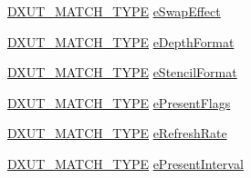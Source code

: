 \begin{DoxyCompactItemize}
\item 
\hyperlink{_d_x_u_t_8h_aaa7d287a94f58c93d67a7ec6b4cb0ee3}{DXUT\_\-MATCH\_\-TYPE} \hyperlink{struct_d_x_u_t_match_options_a6edc86eb4a2a396296cb02744d2b5bc1}{eSwapEffect}
\item 
\hyperlink{_d_x_u_t_8h_aaa7d287a94f58c93d67a7ec6b4cb0ee3}{DXUT\_\-MATCH\_\-TYPE} \hyperlink{struct_d_x_u_t_match_options_abcc0bcc900600d47b8bfb3ff14729642}{eDepthFormat}
\item 
\hyperlink{_d_x_u_t_8h_aaa7d287a94f58c93d67a7ec6b4cb0ee3}{DXUT\_\-MATCH\_\-TYPE} \hyperlink{struct_d_x_u_t_match_options_a42c0d060fd4f125aa830a4bc129a11d7}{eStencilFormat}
\item 
\hyperlink{_d_x_u_t_8h_aaa7d287a94f58c93d67a7ec6b4cb0ee3}{DXUT\_\-MATCH\_\-TYPE} \hyperlink{struct_d_x_u_t_match_options_a1871d1a367039f89933241a41d9d5df0}{ePresentFlags}
\item 
\hyperlink{_d_x_u_t_8h_aaa7d287a94f58c93d67a7ec6b4cb0ee3}{DXUT\_\-MATCH\_\-TYPE} \hyperlink{struct_d_x_u_t_match_options_a2bdf3f5414a3b81555e458d5e5610038}{eRefreshRate}
\item 
\hyperlink{_d_x_u_t_8h_aaa7d287a94f58c93d67a7ec6b4cb0ee3}{DXUT\_\-MATCH\_\-TYPE} \hyperlink{struct_d_x_u_t_match_options_ad6c25ab273e48f3971d1b8a5aa53d110}{ePresentInterval}
\end{DoxyCompactItemize}



